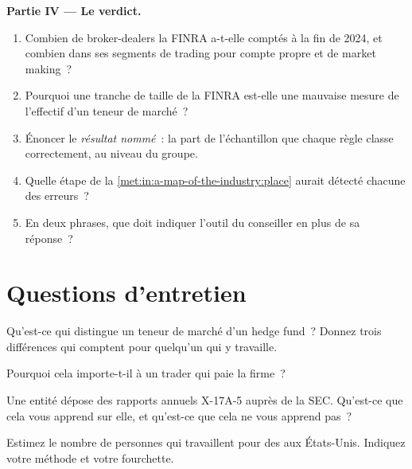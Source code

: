 \begin{problem}
\medskip\noindent\textbf{Partie IV --- Le verdict.}
\begin{enumerate}[resume]
\item Combien de broker-dealers la FINRA a-t-elle comptés à la fin de 2024, et combien dans ses
segments de trading pour compte propre et de market making~?
\item Pourquoi une tranche de taille de la FINRA est-elle une mauvaise mesure de l'effectif d'un teneur de marché~?
\item Énoncer le \emph{résultat nommé}~: la part de l'échantillon que chaque règle classe correctement, au niveau du groupe.
\item Quelle étape de la \cref{met:in:a-map-of-the-industry:place} aurait détecté chacune des erreurs~?
\item En deux phrases, que doit indiquer l'outil du conseiller en plus de sa réponse~?
\end{enumerate}
\end{problem}

\section{Questions d'entretien}

\begin{interviewq}\label{iq:in:a-map-of-the-industry:1}
Qu'est-ce qui distingue un teneur de marché d'un hedge fund~? Donnez trois différences qui comptent pour quelqu'un qui y travaille.
\end{interviewq}

\begin{interviewq}\label{iq:in:a-map-of-the-industry:2}
Pourquoi cela importe-t-il à un trader qui paie la firme~?
\end{interviewq}

\begin{interviewq}\label{iq:in:a-map-of-the-industry:3}
Une entité dépose des rapports annuels X-17A-5 auprès de la SEC. Qu'est-ce que cela vous apprend sur elle, et qu'est-ce que cela ne vous apprend pas~?
\end{interviewq}

\begin{interviewq}\label{iq:in:a-map-of-the-industry:4}
Estimez le nombre de personnes qui travaillent pour des  aux États-Unis. Indiquez votre méthode et votre fourchette.
\end{interviewq}

